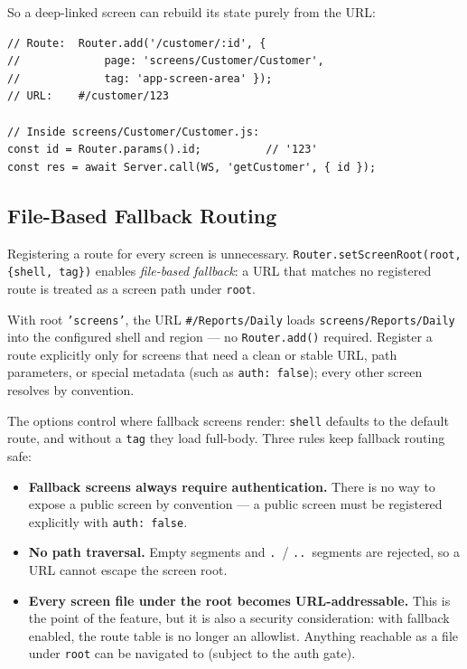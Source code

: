 \noindent
So a deep-linked screen can rebuild its state purely from the URL:

\begin{lstlisting}[style=javascript]
// Route:  Router.add('/customer/:id', {
//             page: 'screens/Customer/Customer',
//             tag: 'app-screen-area' });
// URL:    #/customer/123

// Inside screens/Customer/Customer.js:
const id = Router.params().id;          // '123'
const res = await Server.call(WS, 'getCustomer', { id });
\end{lstlisting}

\subsection{File-Based Fallback Routing}
\label{sec:rs-router-fallback}

Registering a route for every screen is unnecessary.  \texttt{Router.setScreenRoot(root, \{shell, tag\})} enables \emph{file-based fallback}: a URL that matches no registered route is treated as a screen path under \texttt{root}.

With root \texttt{'screens'}, the URL \texttt{\#/Reports/Daily} loads \texttt{screens/Reports/Daily} into the configured shell and region --- no \texttt{Router.add()} required.  Register a route explicitly only for screens that need a clean or stable URL, path parameters, or special metadata (such as \texttt{auth:\ false}); every other screen resolves by convention.

The options control where fallback screens render: \texttt{shell} defaults to the default route, and without a \texttt{tag} they load full-body.  Three rules keep fallback routing safe:

\begin{itemize}
  \item \textbf{Fallback screens always require authentication.}  There is no way to expose a public screen by convention --- a public screen must be registered explicitly with \texttt{auth:\ false}.
  \item \textbf{No path traversal.}  Empty segments and \texttt{.}\ / \texttt{..}\ segments are rejected, so a URL cannot escape the screen root.
  \item \textbf{Every screen file under the root becomes URL-addressable.}  This is the point of the feature, but it is also a security consideration: with fallback enabled, the route table is no longer an allowlist.  Anything reachable as a file under \texttt{root} can be navigated to (subject to the auth gate).
\end{itemize}

